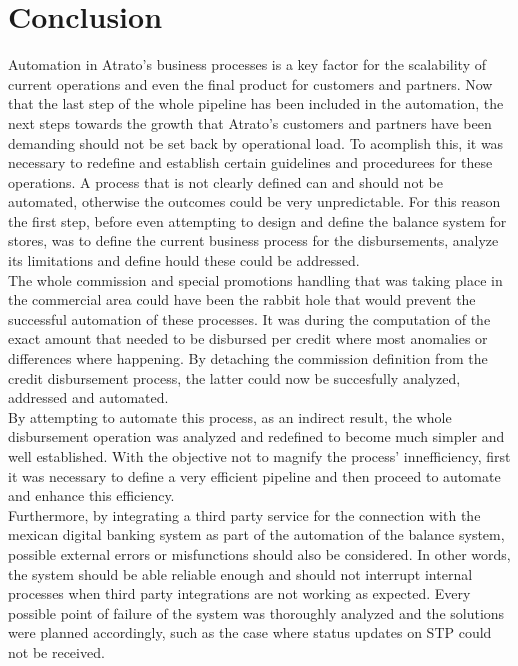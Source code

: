 \section{Conclusion}

Automation in Atrato's business processes is a key factor for the scalability of current operations and even the final product for customers and partners. Now that the last step of the whole pipeline has been included in the automation, the next steps towards the growth that Atrato's customers and partners have been demanding should not be set back by operational load. To acomplish this, it was necessary to redefine and establish certain guidelines and procedurees for these operations. A process that is not clearly defined can and should not be automated, otherwise the outcomes could be very unpredictable. For this reason the first step, before even attempting to design and define the balance system for stores, was to define the current business process for the disbursements, analyze its limitations and define hould these could be addressed.\\

The whole commission and special promotions handling that was taking place in the commercial area could have been the rabbit hole that would prevent the successful automation of these processes. It was during the computation of the exact amount that needed to be disbursed per credit where most anomalies or differences where happening. By detaching the commission definition from the credit disbursement process, the latter could now be succesfully analyzed, addressed and automated.\\

By attempting to automate this process, as an indirect result, the whole disbursement operation was analyzed and redefined to become much simpler and well established. With the objective not to magnify the process' innefficiency, first it was necessary to define a very efficient pipeline and then proceed to automate and enhance this efficiency.\\

Furthermore, by integrating a third party service for the connection with the mexican digital banking system as part of the automation of the balance system, possible external errors or misfunctions should also be considered. In other words, the system should be able reliable enough and should not interrupt internal processes when third party integrations are not working as expected. Every possible point of failure of the system was thoroughly analyzed and the solutions were planned accordingly, such as the case where status updates on STP could not be received.\\

